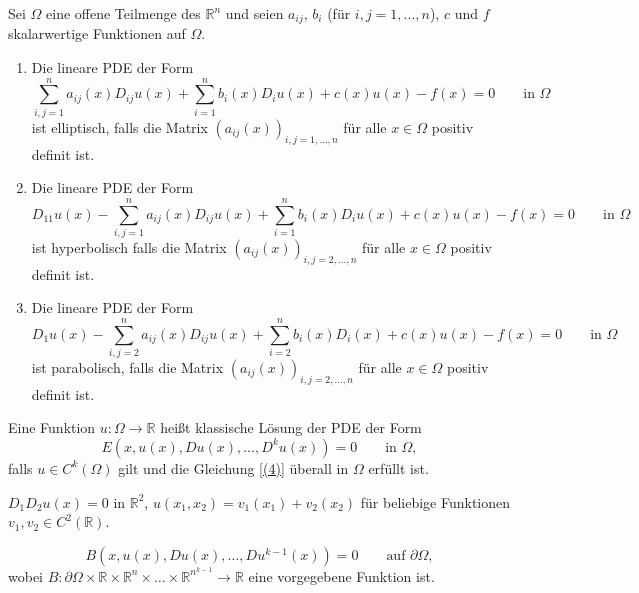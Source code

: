 \begin{beispiel}
Sei $\Omega$ eine offene Teilmenge des $\mathbb{R}^n$ und seien $a_{ij}$, $b_i$ (für $i,j=1,\dots,n$), $c$ und $f$ skalarwertige Funktionen auf $\Omega$.
\begin{enumerate}
	\item Die lineare PDE der Form
	\[
		\sum^{n}_{i,j=1} a_{ij}(x) D_{ij}u(x) + \sum^{n}_{i=1}b_i(x) D_iu(x) + c(x)u(x) - f(x) = 0 \qquad \text{in } \Omega
	\]
	ist elliptisch, falls die Matrix $\left(a_{ij}(x)\right)_{i,j=1,\dots,n}$ für alle $x \in \Omega$ positiv definit ist.
	\item Die lineare PDE der Form 
	\[
		D_11u(x) - \sum^{n}_{i,j=1} a_{ij}(x)D_{ij}u(x) + \sum^{n}_{i=1}b_i(x) D_iu(x) + c(x)u(x) - f(x) = 0 \qquad \text{in }\Omega
	\]
	ist hyperbolisch falls die Matrix $\left( a_{ij}(x) \right)_{i,j=2,\dots,n}$ für alle $x \in \Omega$ positiv definit ist.
	\item Die lineare PDE der Form 
	\begin{equation}
		D_1u(x) - \sum^{n}_{i,j=2}a_{ij}(x)D_{ij}u(x) + \sum^{n}_{i=2}b_i(x)D_i(x) + c(x)u(x)- f(x)= 0 \qquad \text{in } \Omega
	\end{equation}
	ist parabolisch, falls die Matrix $\left( a_{ij}(x) \right)_{i,j=2,\dots,n}$ für alle $x \in \Omega$ positiv definit ist.
 \end{enumerate}
\end{beispiel}

\begin{definition}
	Eine Funktion $u: \Omega \to  \mathbb{R}$ heißt klassische Lösung der PDE der Form 
	\begin{equation}
		E(x,u(x),Du(x),\dots,D^ku(x))=0 \qquad  \text{in } \Omega, \label{(4)}
	\end{equation}
	falls $u \in  C^k(\Omega)$ gilt und die Gleichung \eqref{(4)} überall in $\Omega$ erfüllt ist.
\end{definition}

\begin{beispiel}
	$D_1D_2u(x)=0$ in $\mathbb{R}^2$, $u(x_1,x_2)=v_1(x_1)+v_2(x_2)$ für beliebige Funktionen $v_1,v_2 \in C^2(\mathbb{R})$.
\end{beispiel}  

\begin{nb} 
\[
	B(x,u(x),Du(x),\dots,Du^{k-1}(x))=0 \qquad  \text{auf }\partial \Omega,
\] wobei $B: \partial \Omega \times \mathbb{R} \times \mathbb{R}^n \times \dots \times \mathbb{R}^{n^{k-1}} \to \mathbb{R}$ eine vorgegebene Funktion ist.
\end{nb}

